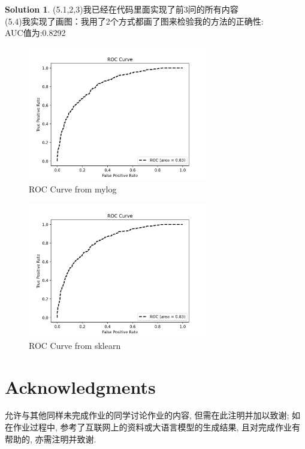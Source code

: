 \documentclass[a4paper,UTF8]{article}
\numberwithin{equation}{section}
\theoremstyle{definition}
\newtheorem*{solution}{Solution}
\begin{document}
\begin{solution}
    (5.1,2,3)我已经在代码里面实现了前3问的所有内容\\
    (5.4)我实现了画图：我用了2个方式都画了图来检验我的方法的正确性:\\
    AUC值为:0.8292\\
    \begin{figure}[H]
        \centering
        \includegraphics[width=0.7\textwidth]{roc_mylog.png}
        \caption{ROC Curve from mylog}
        \label{fig:roc}
    \end{figure}
    \begin{figure}[H]
        \centering
        \includegraphics[width=0.7\textwidth]{roc_sklearn.png}
        \caption{ROC Curve from sklearn}
        \label{fig:roc1}
    \end{figure}
\end{solution}


\newpage
\section*{Acknowledgments}
允许与其他同样未完成作业的同学讨论作业的内容, 但需在此注明并加以致谢; 如在作业过程中, 参考了互联网上的资料或大语言模型的生成结果, 且对完成作业有帮助的, 亦需注明并致谢.
\end{document}
